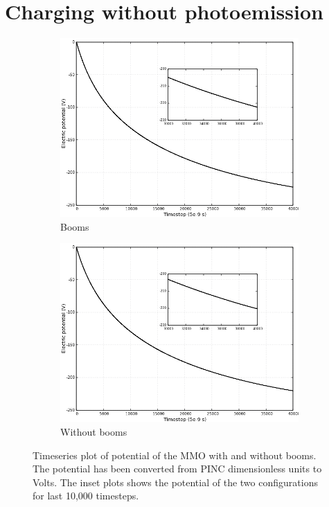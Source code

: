 \section{Charging without photoemission}
\begin{center}
    \begin{figure}[H]
      \begin{subfigure}[b]{0.75\textwidth}
      \includegraphics[width=\columnwidth]{figures/MMO/noPH/WB/C_noPH_WB.png}
      \caption{Booms}
      \label{fig:C_noPH_WB}
    \end{subfigure}
    \par\bigskip
    \begin{subfigure}[b]{0.75\textwidth}
      \includegraphics[width=\columnwidth]{figures/MMO/noPH/NB/C_noPH_NB.png}
      \caption{Without booms}
      \label{fig:C_noPH_NB}
    \end{subfigure}
  \label{fig:ConvnoPH}
  \caption{Timeseries plot of potential of the MMO with and without booms. The potential has been converted from PINC dimensionless units to Volts. The inset plots shows the potential of the two configurations for last 10,000 timesteps.}
  \end{figure}
\end{center}

